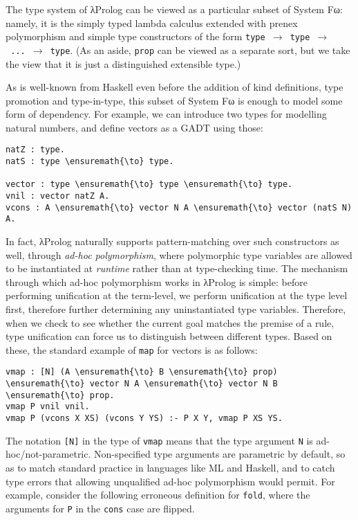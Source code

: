 The type system of \foreignlanguage{greek}{λ}Prolog can be viewed as a particular subset of
System F\foreignlanguage{greek}{ω}: namely, it is the simply typed lambda calculus extended with
prenex polymorphism and simple type constructors of the form
\texttt{type\ \ensuremath{\to}\ type\ \ensuremath{\to}\ ...\ \ensuremath{\to}\ type}.
(As an aside, \texttt{prop} can be viewed as a separate sort, but we
take the view that it is just a distinguished extensible type.)

As is well-known from Haskell even before the addition of kind
definitions, type promotion and type-in-type, this subset of System F\foreignlanguage{greek}{ω}
is enough to model some form of dependency. For example, we can
introduce two types for modelling natural numbers, and define vectors as
a GADT using those:

\begin{verbatim}
natZ : type.
natS : type \ensuremath{\to} type.

vector : type \ensuremath{\to} type \ensuremath{\to} type.
vnil : vector natZ A.
vcons : A \ensuremath{\to} vector N A \ensuremath{\to} vector (natS N) A.
\end{verbatim}

In fact, \foreignlanguage{greek}{λ}Prolog naturally supports pattern-matching over such
constructors as well, through \emph{ad-hoc polymorphism}, where
polymorphic type variables are allowed to be instantiated at
\emph{runtime} rather than at type-checking time. The mechanism through
which ad-hoc polymorphism works in \foreignlanguage{greek}{λ}Prolog is simple: before performing
unification at the term-level, we perform unification at the type level
first, therefore further determining any uninstantiated type variables.
Therefore, when we check to see whether the current goal matches the
premise of a rule, type unification can force us to distinguish between
different types. Based on these, the standard example of \texttt{map}
for vectors is as follows:

\begin{verbatim}
vmap : [N] (A \ensuremath{\to} B \ensuremath{\to} prop) \ensuremath{\to} vector N A \ensuremath{\to} vector N B \ensuremath{\to} prop.
vmap P vnil vnil.
vmap P (vcons X XS) (vcons Y YS) :- P X Y, vmap P XS YS.
\end{verbatim}

The notation \texttt{{[}N{]}} in the type of \texttt{vmap} means that
the type argument \texttt{N} is ad-hoc/not-parametric. Non-specified
type arguments are parametric by default, so as to match standard
practice in languages like ML and Haskell, and to catch type errors that
allowing unqualified ad-hoc polymorphism would permit. For example,
consider the following erroneous definition for \texttt{fold}, where the
arguments for \texttt{P} in the \texttt{cons} case are flipped.

